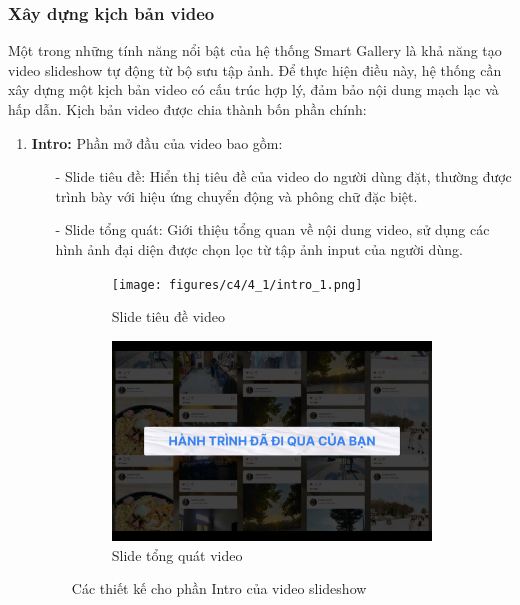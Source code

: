 \subsubsection{Xây dựng kịch bản video}

Một trong những tính năng nổi bật của hệ thống Smart Gallery là khả năng tạo video slideshow tự động từ bộ sưu tập ảnh. Để thực hiện điều này, hệ thống cần xây dựng một kịch bản video có cấu trúc hợp lý, đảm bảo nội dung mạch lạc và hấp dẫn. Kịch bản video được chia thành bốn phần chính:

\begin{enumerate}
    \item \textbf{Intro:} Phần mở đầu của video bao gồm:
    \begin{itemize}
        \item[-] Slide tiêu đề: Hiển thị tiêu đề của video do người dùng đặt, thường được trình bày với hiệu ứng chuyển động và phông chữ đặc biệt.
        \item[-] Slide tổng quát: Giới thiệu tổng quan về nội dung video, sử dụng các hình ảnh đại diện được chọn lọc từ tập ảnh input của người dùng.
    \end{itemize}
    
    \begin{figure}[H]
        \centering
        \begin{subfigure}{0.48\textwidth}
            \texttt{[image: figures/c4/4\_1/intro\_1.png]} 
            \caption{Slide tiêu đề video}
        \end{subfigure}
        \hfill
        \begin{subfigure}{0.48\textwidth}
            \includegraphics[width=1\linewidth]{figures/c4/4_1/intro_2.jpg} 
            \caption{Slide tổng quát video}
        \end{subfigure}
        \caption{Các thiết kế cho phần Intro của video slideshow}
        \label{fig:video-intro-design}
    \end{figure}
    

\end{enumerate}
